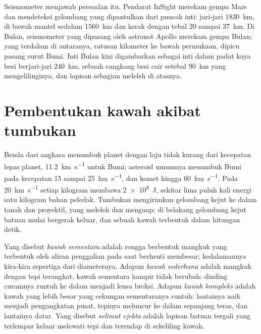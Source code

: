 Seismometer menjawab persoalan itu. Pendarat InSight merekam
gempa Mars dan mendeteksi gelombang yang dipantulkan dari puncak inti: jari-jari
\qty{1830}{km}, di bawah mantel sedalam \qty{1560}{km} dan kerak dengan tebal 20 sampai
\qty{37}{km}. Di Bulan, seismometer yang dipasang oleh astronot Apollo
merekam gempa Bulan; yang terdalam di antaranya, ratusan
kilometer ke bawah permukaan, dipicu pasang surut Bumi. Inti Bulan kini digambarkan
sebagai inti dalam padat kaya besi berjari-jari \qty{240}{km}, sebuah
cangkang besi cair setebal \qty{90}{km} yang mengelilinginya, dan lapisan
sebagian meleleh di atasnya.

\section{Pembentukan kawah akibat tumbukan}\label{sec:b3:planetary-interiors-surfaces:impacts}

Benda dari angkasa menumbuk planet dengan laju tidak kurang dari
kecepatan lepas planet, \qty{11.2}{km.s^{-1}} untuk Bumi; asteroid umumnya
menumbuk Bumi pada kecepatan 15 sampai \qty{25}{km.s^{-1}}, dan komet hingga
\qty{60}{km.s^{-1}}. Pada \qty{20}{km.s^{-1}} setiap kilogram membawa
\qty{2e8}{J}, sekitar lima puluh kali energi satu kilogram bahan peledak. Tumbukan
mengirimkan gelombang kejut ke dalam tanah dan proyektil, yang
meleleh dan menguap; di belakang gelombang kejut batuan mulai bergerak keluar, dan
sebuah kawah terbentuk dalam hitungan detik.

\begin{definition}\label{def:b3:planetary-interiors-surfaces:crater-morphology}
Yang disebut \emph{kawah sementara} adalah rongga berbentuk mangkuk
yang terbentuk oleh aliran penggalian pada saat berhenti membesar; kedalamannya
kira-kira sepertiga dari diameternya. Adapun \emph{kawah
sederhana} adalah mangkuk dengan tepi terangkat, kawah sementara
hampir tidak berubah: dinding curamnya runtuh ke dalam menjadi lensa
breksi. Adapun \emph{kawah kompleks} adalah kawah yang lebih besar
yang cekungan sementaranya runtuh: lantainya naik menjadi pengangkatan pusat, tepinya
meluncur ke dalam sepanjang teras, dan lantainya datar. Yang disebut \emph{selimut
ejekta} adalah lapisan batuan tergali yang terlempar keluar
melewati tepi dan terendap di sekeliling kawah.
\end{definition}

